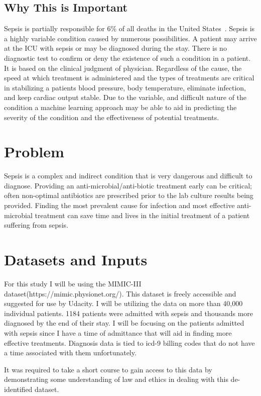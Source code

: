 \documentclass[11pt]{article}
\begin{document}
\subsection{Why This is Important}

Sepsis is partially responsible for 6\% of all deaths in the United States~\cite{cdc}. Sepsis is a highly variable condition caused by numerous possibilities. A patient may arrive at the ICU with sepsis or may be diagnosed during the stay. There is no diagnostic test to confirm or deny the existence of such a condition in a patient. It is based on the clinical judgment of physician. Regardless of the cause, the speed at which treatment is administered and the types of treatments are critical in stabilizing a patients blood pressure, body temperature, eliminate infection, and keep cardiac output stable. Due to the variable, and difficult nature of the condition a machine learning approach may be able to aid in predicting the severity of the condition and the effectiveness of potential treatments.


\section{Problem}
Sepsis is a complex and indirect condition that is very dangerous and difficult to diagnose. Providing an anti-microbial/anti-biotic treatment early can be critical; often non-optimal antibiotics are prescribed prior to the lab culture results being provided. Finding the most prevalent cause for infection and most effective anti-microbial treatment can save time and lives in the initial treatment of a patient suffering from sepsis.
\section{Datasets and Inputs}
For this study I will be using the MIMIC-III dataset(https://mimic.physionet.org/). This dataset is freely accessible and suggested for use by Udacity. I will be utilizing the data on more than 40,000 individual patients. 1184 patients were admitted with sepsis and thousands more diagnosed by the end of their stay. I will be focusing on the patients admitted with sepsis since I have a time of admittance that will aid in finding more effective treatments. Diagnosis data is tied to icd-9 billing codes that do not have a time associated with them unfortunately.

It was required to take a short course to gain access to this data by demonstrating some understanding of law and ethics in dealing with this de-identified dataset.
\end{document}
